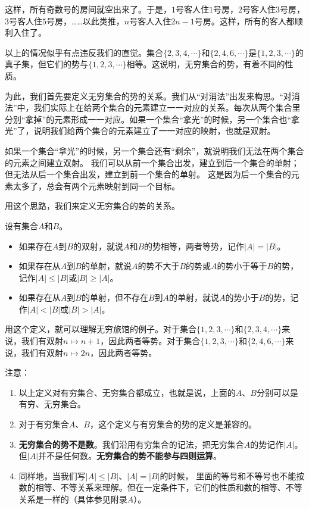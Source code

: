 \documentclass[12pt,UTF8]{ctexbook}
\begin{document}
这样，所有奇数号的房间就空出来了。于是，$1$号客人住$1$号房，$2$号客人住$3$号房，$3$号客人住$5$号房，……以此类推，$n$号客人入住$2n-1$号房。这样，所有的客人都顺利入住了。

以上的情况似乎有点违反我们的直觉。集合$\{2,3,4,\cdots\}$和$\{2,4,6,\cdots\}$是$\{1,2,3,\cdots\}$的真子集，但它们的势与$\{1,2,3,\cdots\}$相等。这说明，无穷集合的势，有着不同的性质。

为此，我们首先要定义无穷集合的势的关系。我们从“对消法”出发来构思。“对消法”中，我们实际上在给两个集合的元素建立一一对应的关系。每次从两个集合里分别“拿掉”的元素形成一一对应。如果一个集合“拿光”的时候，另一个集合也“拿光”了，说明我们给两个集合的元素建立了一一对应的映射，也就是双射。

如果一个集合“拿光”的时候，另一个集合还有“剩余”，就说明我们无法在两个集合的元素之间建立双射。
我们可以从前一个集合出发，建立到后一个集合的单射；但无法从后一个集合出发，建立到前一个集合的单射。
这是因为后一个集合的元素太多了，总会有两个元素映射到同一个目标。

用这个思路，我们来定义无穷集合的势的关系。

\begin{df}\label{df:1-0-0}
    设有集合$A$和$B$。
    \begin{itemize}
        \item 如果存在$A$到$B$的双射，就说$A$和$B$的势相等，两者等势，记作$|A| = |B|$。
        \item 如果存在从$A$到$B$的单射，就说$A$的势不大于$B$的势或$A$的势小于等于$B$的势，记作$|A| \leqslant |B|$或$|B| \geqslant |A|$。
        \item 如果存在从$A$到$B$的单射，但不存在$B$到$A$的单射，就说$A$的势小于$B$的势，记作$|A| < |B|$或$|B| > |A|$。
    \end{itemize}
\end{df}

用这个定义，就可以理解无穷旅馆的例子。对于集合$\{1,2,3,\cdots\}$和$\{2,3,4,\cdots\}$来说，我们有双射$n\mapsto n+1$，因此两者等势。对于集合$\{1,2,3,\cdots\}$和$\{2,4,6,\cdots\}$来说，我们有双射$n\mapsto 2n$，因此两者等势。

注意：
\begin{enumerate}
    \item 以上定义对有穷集合、无穷集合都成立，也就是说，上面的$A$、$B$分别可以是有穷、无穷集合。
    \item 对于有穷集合$A$、$B$，这个定义与有穷集合的势的定义是兼容的。
    \item \textbf{无穷集合的势不是数}。我们沿用有穷集合的记法，把无穷集合$A$的势记作$|A|$。
    但$|A|$并不是任何数。\textbf{无穷集合的势不能参与四则运算}。
    \item 同样地，当我们写$|A| \leqslant |B|$、$|A| = |B|$的时候，
    里面的等号和不等号也不能按数的相等、不等关系来理解。但在一定条件下，它们的性质和数的相等、不等关系是一样的（具体参见附录$A$）。
\end{enumerate}
\end{document}
